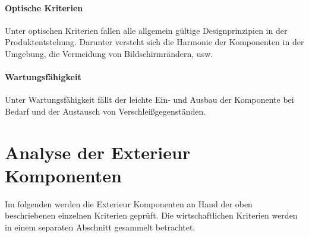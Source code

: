 \paragraph{Optische Kriterien}
Unter optischen Kriterien fallen alle allgemein gültige Designprinzipien in der Produktentstehung. Darunter versteht sich die Harmonie der Komponenten in der Umgebung, die Vermeidung von Bildschirmrändern, usw.
\paragraph{Wartungsfähigkeit}
Unter Wartungsfähigkeit fällt der leichte Ein- und Ausbau der Komponente bei Bedarf und der Austausch von Verschleißgegenständen.
\section{Analyse der Exterieur Komponenten}
Im folgenden werden die Exterieur Komponenten an Hand der oben beschriebenen einzelnen Kriterien geprüft. Die wirtschaftlichen Kriterien werden in einem separaten Abschnitt gesammelt betrachtet. 
